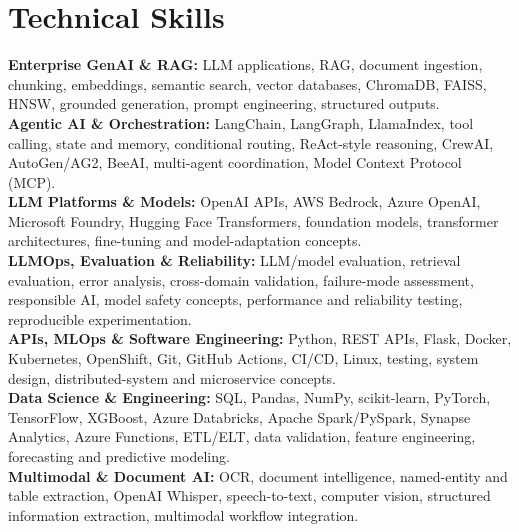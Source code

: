 \documentclass[9pt,letterpaper]{extarticle}
\begin{document}
\section{Technical Skills}
\textbf{Enterprise GenAI \& RAG:} LLM applications, RAG, document ingestion, chunking, embeddings, semantic search, vector databases, ChromaDB, FAISS, HNSW, grounded generation, prompt engineering, structured outputs.\\
\textbf{Agentic AI \& Orchestration:} LangChain, LangGraph, LlamaIndex, tool calling, state and memory, conditional routing, ReAct-style reasoning, CrewAI, AutoGen/AG2, BeeAI, multi-agent coordination, Model Context Protocol (MCP).\\
\textbf{LLM Platforms \& Models:} OpenAI APIs, AWS Bedrock, Azure OpenAI, Microsoft Foundry, Hugging Face Transformers, foundation models, transformer architectures, fine-tuning and model-adaptation concepts.\\
\textbf{LLMOps, Evaluation \& Reliability:} LLM/model evaluation, retrieval evaluation, error analysis, cross-domain validation, failure-mode assessment, responsible AI, model safety concepts, performance and reliability testing, reproducible experimentation.\\
\textbf{APIs, MLOps \& Software Engineering:} Python, REST APIs, Flask, Docker, Kubernetes, OpenShift, Git, GitHub Actions, CI/CD, Linux, testing, system design, distributed-system and microservice concepts.\\
\textbf{Data Science \& Engineering:} SQL, Pandas, NumPy, scikit-learn, PyTorch, TensorFlow, XGBoost, Azure Databricks, Apache Spark/PySpark, Synapse Analytics, Azure Functions, ETL/ELT, data validation, feature engineering, forecasting and predictive modeling.\\
\textbf{Multimodal \& Document AI:} OCR, document intelligence, named-entity and table extraction, OpenAI Whisper, speech-to-text, computer vision, structured information extraction, multimodal workflow integration.
\end{document}
